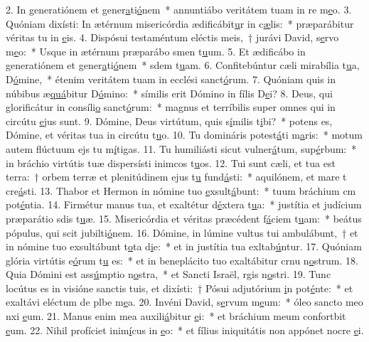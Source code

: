 2. In generatiónem et gener\uline{a}ti\uline{ó}nem~* annuntiábo veritátem tuam in re m\uline{e}o.
3. Quóniam dixísti: In ætérnum misericórdia ædificábit\uline{u}r in c\uline{æ}lis:~* præparábitur véritas tu in \uline{e}is.
4. Dispósui testaméntum eléctis meis,~† jurávi David, s\uline{e}rvo m\uline{e}o:~* Usque in ætérnum præparábo smen t\uline{u}um.
5. Et ædificábo in generatiónem et gener\uline{a}ti\uline{ó}nem~* sdem t\uline{u}am.
6. Confitebúntur cæli mirabília t\uline{u}a, D\uline{ó}mine,~* étenim veritátem tuam in ecclési sanct\uline{ó}rum.
7. Quóniam quis in núbibus æ\uline{quá}bitur D\uline{ó}mino:~* símilis erit Dómino in fílis D\uline{e}i?
8. Deus, qui glorificátur in consíli\uline{o} sanct\uline{ó}rum:~* magnus et terríbilis super omnes qui in circútu \uline{e}jus sunt.
9. Dómine, Deus virtútum, quis s\uline{í}milis t\uline{i}bi?~* potens es, Dómine, et véritas tua in circútu t\uline{u}o.
10. Tu domináris potest\uline{á}ti m\uline{a}ris:~* motum autem flúctuum ejs tu m\uline{í}tigas.
11. Tu humiliásti sicut vulner\uline{á}tum, sup\uline{é}rbum:~* in bráchio virtútis tuæ dispersísti inimcos t\uline{u}os.
12. Tui sunt cæli, et tua est terra:~† orbem terræ et plenitúdinem ejus t\uline{u} fund\uline{á}sti:~* aquilónem, et mare t cre\uline{á}sti.
13. Thabor et Hermon in nómine tuo \uline{e}xsult\uline{á}bunt:~* tuum bráchium cm pot\uline{é}ntia.
14. Firmétur manus tua, et exaltétur d\uline{é}xtera t\uline{u}a:~* justítia et judícium præparátio sdis t\uline{u}æ.
15. Misericórdia et véritas præcédent f\uline{á}ciem t\uline{u}am:~* beátus pópulus, qui scit jubilti\uline{ó}nem.
16. Dómine, in lúmine vultus tui ambulábunt,~† et in nómine tuo exsultábunt t\uline{o}ta d\uline{i}e:~* et in justítia tua exltab\uline{ú}ntur.
17. Quóniam glória virtútis e\uline{ó}rum t\uline{u} es:~* et in beneplácito tuo exaltábitur crnu n\uline{o}strum.
18. Quia Dómini est ass\uline{ú}mptio n\uline{o}stra,~* et Sancti Israël, rgis n\uline{o}stri.
19. Tunc locútus es in visióne sanctis tuis, et dixísti:~† Pósui adjutórium \uline{i}n pot\uline{é}nte:~* et exaltávi eléctum de plbe m\uline{e}a.
20. Invéni David, s\uline{e}rvum m\uline{e}um:~* óleo sancto meo nxi \uline{e}um.
21. Manus enim mea auxili\uline{á}bitur \uline{e}i:~* et bráchium meum confortbit \uline{e}um.
22. Nihil profíciet inim\uline{í}cus in \uline{e}o:~* et fílius iniquitátis non appónet nocre \uline{e}i.
